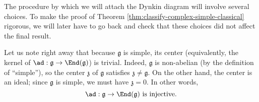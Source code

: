 \documentclass[reqno]{amsart} 
\begin{document}
The procedure by which we will attach the Dynkin diagram will involve several choices.  To make the proof of Theorem \ref{thm:classify-complex-simple-classical} rigorous, we will later have to go back and check that these choices did not affect the final result.

Let us note right away that because $\mathfrak{g}$ is simple, its center (equivalently, the kernel of $\ad : \mathfrak{g} \rightarrow \End(\mathfrak{g})$) is trivial.  Indeed, $\mathfrak{g}$ is non-abelian (by the definition of ``simple''), so the center $\mathfrak{z}$ of $\mathfrak{g}$ satisfies $\mathfrak{z} \neq \mathfrak{g}$.  On the other hand, the center is an ideal; since $\mathfrak{g}$ is simple, we must have $\mathfrak{z} = 0$.  In other words,
\begin{equation}\label{eq:adjoint-map-is-injective}
  \ad : \mathfrak{g} \rightarrow \End(\mathfrak{g})
  \text{ is injective.}
\end{equation}
\end{document}
